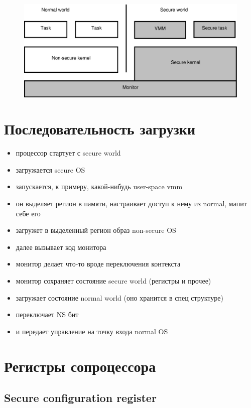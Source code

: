 \documentclass[11pt]{article}
\begin{document}
\begin{figure}[tbph]
\centering
\includegraphics[width=0.9\linewidth]{./software_model}
\caption{}
\label{fig:software_model}
\end{figure}

\section{Последовательность загрузки}

\begin{itemize}
\item процессор стартует с secure world
\item загружается secure OS
\item запускается, к примеру, какой-нибудь user-space vmm
\item он выделяет регион в памяти, настраивает доступ к нему из normal, мапит себе его
\item загружет в выделенный регион образ non-secure OS
\item далее вызывает код монитора
\item монитор делает что-то вроде переключения контекста
\item монитор сохраняет состояние secure world (регистры и прочее)
\item загружает состояние normal world (оно хранится в спец структуре)
\item переключает NS бит
\item и передает управление на точку входа normal OS
\end{itemize}
\section{Регистры сопроцессора}

\subsection{Secure configuration register} \label{sec:SCR}
\end{document}
